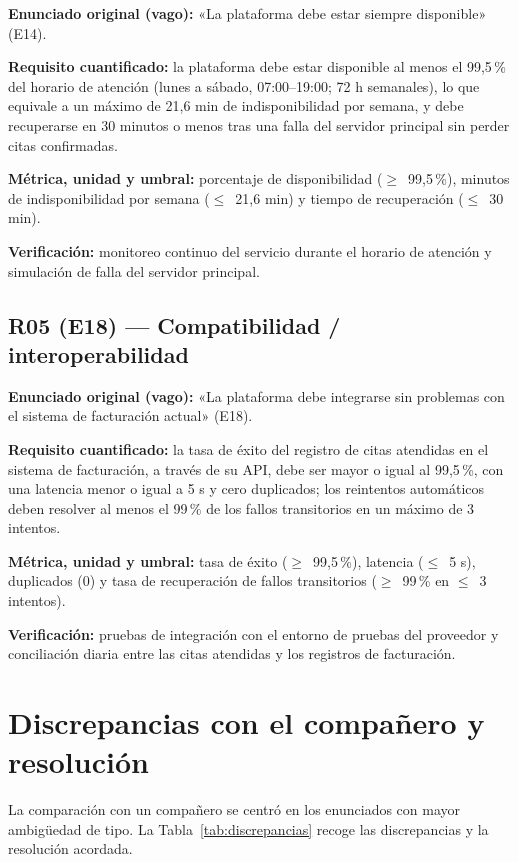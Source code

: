 \documentclass[11pt,a4paper]{article}
\begin{document}
\textbf{Enunciado original (vago):} «La plataforma debe estar siempre disponible» (E14).

\textbf{Requisito cuantificado:} la plataforma debe estar disponible al menos el 99,5\,\% del horario de atención (lunes a sábado, 07:00--19:00; 72 h semanales), lo que equivale a un máximo de 21,6 min de indisponibilidad por semana, y debe recuperarse en 30 minutos o menos tras una falla del servidor principal sin perder citas confirmadas.

\textbf{Métrica, unidad y umbral:} porcentaje de disponibilidad ($\geq$~99,5\,\%), minutos de indisponibilidad por semana ($\leq$~21,6 min) y tiempo de recuperación ($\leq$~30 min).

\textbf{Verificación:} monitoreo continuo del servicio durante el horario de atención y simulación de falla del servidor principal.

\subsection{R05 (E18) --- Compatibilidad / interoperabilidad}

\textbf{Enunciado original (vago):} «La plataforma debe integrarse sin problemas con el sistema de facturación actual» (E18).

\textbf{Requisito cuantificado:} la tasa de éxito del registro de citas atendidas en el sistema de facturación, a través de su API, debe ser mayor o igual al 99,5\,\%, con una latencia menor o igual a 5 s y cero duplicados; los reintentos automáticos deben resolver al menos el 99\,\% de los fallos transitorios en un máximo de 3 intentos.

\textbf{Métrica, unidad y umbral:} tasa de éxito ($\geq$~99,5\,\%), latencia ($\leq$~5 s), duplicados (0) y tasa de recuperación de fallos transitorios ($\geq$~99\,\% en $\leq$~3 intentos).

\textbf{Verificación:} pruebas de integración con el entorno de pruebas del proveedor y conciliación diaria entre las citas atendidas y los registros de facturación.

\section{Discrepancias con el compañero y resolución}

La comparación con un compañero se centró en los enunciados con mayor ambigüedad de tipo. La Tabla~\ref{tab:discrepancias} recoge las discrepancias y la resolución acordada.
\end{document}
